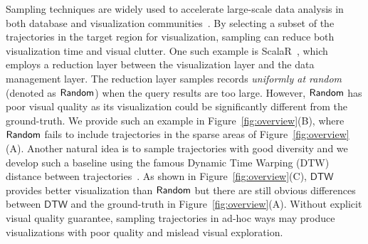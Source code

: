  Sampling techniques are widely used to accelerate large-scale data analysis in both database and visualization communities~\cite{qin2020making,DBLP:conf/sigmod/DingHCC016,DBLP:journals/pvldb/KimBPIMR15,park2016visualization}. By selecting a subset of the trajectories in the target region for visualization, sampling can reduce both visualization time and visual clutter. One such example is ScalaR~\cite{battle2013dynamic}, which employs a reduction layer between the visualization layer and the data management layer. The reduction layer samples records \textit{uniformly at random} (denoted as $\mathsf{Random}$) when the query results are too large. However, $\mathsf{Random}$ has poor visual quality as its visualization could be significantly different from the ground-truth. We provide such an example in Figure~\ref{fig:overview}(B), where $\mathsf{Random}$ fails to include trajectories in the sparse areas of Figure~\ref{fig:overview}(A). Another natural idea is to sample trajectories with good diversity and we develop such a baseline using the famous Dynamic Time Warping (DTW) distance between trajectories~\cite{borcan2012improving}. As shown in Figure~\ref{fig:overview}(C), $\mathsf{DTW}$ provides better visualization than $\mathsf{Random}$ but there are still obvious differences between $\mathsf{DTW}$ and the ground-truth in Figure~\ref{fig:overview}(A). Without explicit visual quality guarantee, sampling trajectories in ad-hoc ways may produce visualizations with poor quality and mislead visual exploration.

%
%

